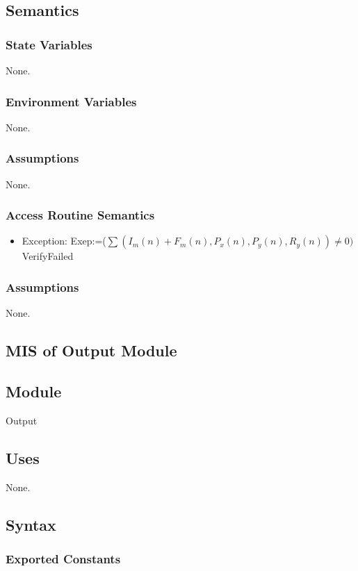 \documentclass[12pt, titlepage]{article}
\begin{document}
\subsection{Semantics}
\subsubsection{State Variables}
None.

\subsubsection{Environment Variables}
None.

\subsubsection{Assumptions}
None.
\subsubsection{Access Routine Semantics}
\begin{itemize}
    \item Exception: Exep:=($\sum { (I_m(n) + F_m(n), P_x(n),P_y(n),R_y(n))} \neq 0)$ \Rightarrow VerifyFailed
\end{itemize}
\subsubsection{Assumptions}
None.

\subsection{MIS of Output Module \label{mSpec} }

\subsection{Module}

Output

\subsection{Uses}
None.

\subsection{Syntax}

\subsubsection{Exported Constants}
\end{document}
